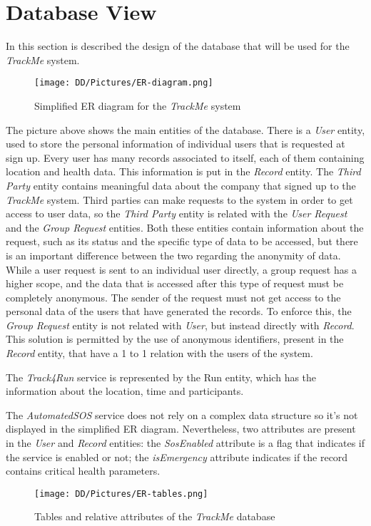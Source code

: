 \section{Database View}

In this section is described the design of the database that will be used for the \textit{TrackMe} system. 

\begin{figure}[H]
\texttt{[image: DD/Pictures/ER-diagram.png]}
\centering
\caption{Simplified ER diagram for the \textit{TrackMe} system}
\end{figure}

The picture above shows the main entities of the database. There is a \textit{User} entity, used to store the personal information of individual users that is requested at sign up. Every user has many records associated to itself, each of them containing location and health data. This information is put in the \textit{Record} entity. The \textit{Third Party} entity contains meaningful data about the company that signed up to the \textit{TrackMe} system. Third parties can make requests to the system in order to get access to user data, so the \textit{Third Party} entity is related with the \textit{User Request} and the \textit{Group Request} entities. Both these entities contain information about the request, such as its status and the specific type of data to be accessed, but there is an important difference between the two regarding the anonymity of data. While a user request is sent to an individual user directly, a group request has a higher scope, and the data that 
is accessed after this type of request must be completely anonymous. The sender of the request must not get access to the personal data of the users that have generated the records. To enforce this, the \textit{Group Request} entity is not related with \textit{User}, but instead directly with \textit{Record}. This solution is permitted by the use of anonymous identifiers, present in the \textit{Record} entity, that have a 1 to 1 relation with the users of the system.

The \textit{Track4Run} service is represented by the Run entity, which has the information about the location, time and participants.

The \textit{AutomatedSOS} service does not rely on a complex data structure so it’s not displayed in the simplified ER diagram. Nevertheless, two attributes are present in the \textit{User} and \textit{Record} entities: the \textit{SosEnabled} attribute is a flag that indicates if the service is enabled or not; the \textit{isEmergency} attribute indicates if the record contains critical health parameters.

\begin{figure}[H]
\texttt{[image: DD/Pictures/ER-tables.png]}
\centering
\caption{Tables and relative attributes of the \textit{TrackMe} database}
\end{figure}